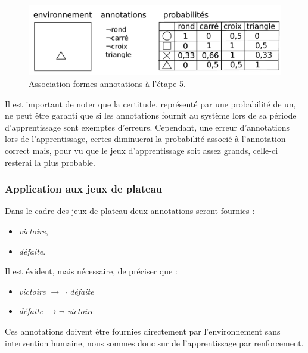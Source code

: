 \begin{figure}[H] 
\includegraphics[width=\textwidth]{files/raisonneur/annotations_5} 
\caption{Association formes-annotations à l'étape 5.} 
\label{img_annotations_5}
\end{figure}

Il est important de noter que la certitude, représenté par une probabilité de un, ne peut être garanti que si les annotations fournit au système lors de sa période d'apprentissage sont exemptes d'erreurs. Cependant, une erreur d'annotations lors de l'apprentissage, certes diminuerai la probabilité associé à l'annotation correct mais, pour vu que le jeux d'apprentissage soit assez grands, celle-ci resterai la plus probable.

\subsubsection{Application aux jeux de plateau}

Dans le cadre des jeux de plateau deux annotations seront fournies :
\begin{itemize}
\item \emph{victoire},
\item \emph{défaite}.
\end{itemize}
Il est évident, mais nécessaire, de préciser que :
\begin{itemize}
\item \emph{victoire} $\rightarrow{}\neg{}$ \emph{défaite}
\item \emph{défaite} $\rightarrow{}\neg{}$ \emph{victoire}
\end{itemize}

Ces annotations doivent être fournies directement par l'environnement sans intervention humaine, nous sommes donc sur de l'apprentissage par renforcement.
